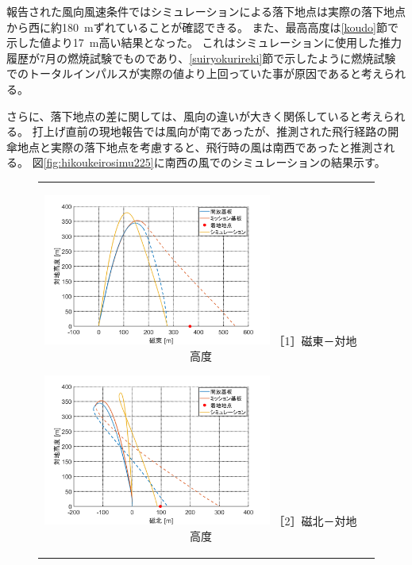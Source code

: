 \documentclass[a4paper,11pt,uplatex]{jsarticle}
\begin{document}
報告された風向風速条件ではシミュレーションによる落下地点は実際の落下地点から西に約\SI{180}{m}ずれていることが確認できる。
また、最高高度は\ref{koudo}節で示した値より\SI{17}{m}高い結果となった。
これはシミュレーションに使用した推力履歴が7月の燃焼試験でものであり、\ref{suiryokurireki}節で示したように燃焼試験でのトータルインパルスが実際の値より上回っていた事が原因であると考えられる。

さらに、落下地点の差に関しては、風向の違いが大きく関係していると考えられる。
打上げ直前の現地報告では風向が南であったが、推測された飛行経路の開傘地点と実際の落下地点を考慮すると、飛行時の風は南西であったと推測される。
図\ref{fig:hikoukeirosimu225}に南西の風でのシミュレーションの結果示す。

\begin{figure}[H]
	\begin{tabular}{cc}
		\begin{minipage}{.48\textwidth}
			\centering
			\includegraphics[width=75mm]{pic_sim/pos3_eh_225.png}
			\hspace{16mm} {\small［1］磁東－対地高度}
		\end{minipage}
		\begin{minipage}{.48\textwidth}
			\centering
			\includegraphics[width=75mm]{pic_sim/pos3_nh_225.png}
			\hspace{16mm} {\small［2］磁北－対地高度}
		\end{minipage}
	\end{tabular}
	\centering
	\begin{minipage}{.48\textwidth}
		\centering

\end{minipage}
\end{figure}
\end{document}
